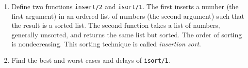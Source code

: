 \documentclass[11pt,a4paper]{article}
\author{Christian Rinderknecht}
\date{15 October 2009}
\newcommand\erlcode[1]{\texttt{#1}}
\begin{document}
\maketitle

\thispagestyle{empty}

\begin{enumerate}

  \item Define two functions \erlcode{insert/2} and
    \erlcode{isort/1}. The first inserts a number (the first argument)
    in an ordered list of numbers (the second argument) such that the
    result is a sorted list. The second function takes a list of
    numbers, generally unsorted, and returns the same list but
    sorted. The order of sorting is nondecreasing. This sorting
    technique is called \emph{insertion sort}.

  \item Find the best and worst cases and delays of \erlcode{isort/1}.

\end{enumerate}
\end{document}
